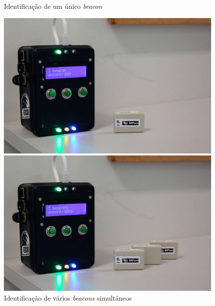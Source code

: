 \begin{figure}[htb]
	\centering
 	\begin{minipage}{0.45\textwidth}
		\centering
		\caption{\label{fig:peacon1}Identificação de um único \textit{beacon}}
		\includegraphics[width=1\textwidth]{img/peacon1.jpg}
	\end{minipage}
	\hfill
	\begin{minipage}{0.45\textwidth}
		\centering
		\caption{\label{fig:peacon2}Identificação de vários \textit{beacons} simultâneos}
		\includegraphics[width=1\textwidth]{img/peacon2.jpg}
	\end{minipage}
\end{figure}

